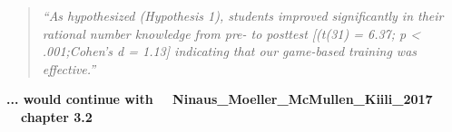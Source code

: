 \documentclass[11pt, a4paper]{article}
\begin{document}
\newpage

\begin{quote}
    \textit{``As  hypothesized  (Hypothesis  1),  students improved significantly in their rational number knowledge from pre- to posttest [(t(31) = 6.37; p < .001;Cohen's d = 1.13] indicating that our game-based training was effective.''}\hfill~\cite{Ninaus_Moeller_McMullen_Kiili_2017}
\end{quote}

\textbf{... would continue with \ \ Ninaus\_Moeller\_McMullen\_Kiili\_2017 \ \ chapter 3.2}

\newpage

\printbibliography
\end{document}
